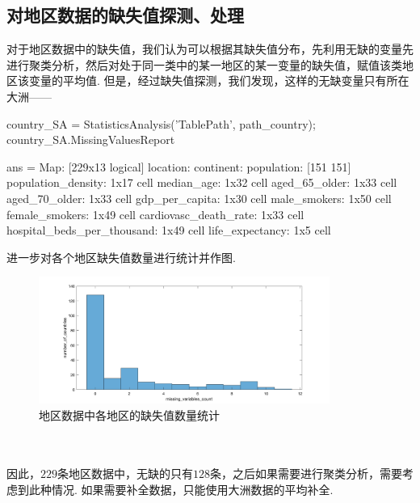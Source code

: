 \documentclass[a4paper, titlepage]{article}
\begin{document}
    \subsection{对地区数据的缺失值探测、处理}
        对于地区数据中的缺失值，我们认为可以根据其缺失值分布，先利用无缺的变量先进行聚类分析，然后对处于同一类中的某一地区的某一变量的缺失值，赋值该类地区该变量的平均值. 但是，经过缺失值探测，我们发现，这样的无缺变量只有所在大洲——
\begin{matlabcode}
country_SA = StatisticsAnalysis('TablePath', path_country);
country_SA.MissingValuesReport
\end{matlabcode}
\begin{spacing}{0.8}
\begin{matlaboutput}
ans = 
                               Map: [229x13 logical]
                          location: {}
                         continent: {}
                        population: {[151 151]}
                population_density: {1x17 cell}
                        median_age: {1x32 cell}
                     aged_65_older: {1x33 cell}
                     aged_70_older: {1x33 cell}
                    gdp_per_capita: {1x30 cell}
                      male_smokers: {1x50 cell}
                    female_smokers: {1x49 cell}
             cardiovasc_death_rate: {1x33 cell}
        hospital_beds_per_thousand: {1x49 cell}
                   life_expectancy: {1x5 cell}
\end{matlaboutput}
\end{spacing}
    进一步对各个地区缺失值数量进行统计并作图.\\
    \begin{minipage}{\textwidth}
        \begin{figure}[H]
            \centering
            \includegraphics[width=0.85\textwidth]{./images/MissingValues_Country.png}
            \caption{地区数据中各地区的缺失值数量统计}
            \label{images:MissingValues_Country}
        \end{figure}
    \end{minipage}\\\quad\\
    因此，$229$条地区数据中，无缺的只有$128$条，之后如果需要进行聚类分析，需要考虑到此种情况. 如果需要补全数据，只能使用大洲数据的平均补全.
    
\end{document}
